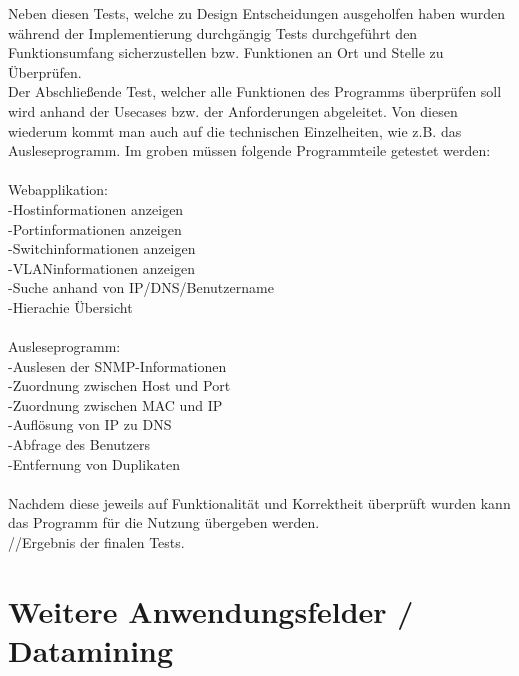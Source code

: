 Neben diesen Tests, welche zu Design Entscheidungen ausgeholfen haben wurden während der Implementierung durchgängig Tests durchgeführt den Funktionsumfang sicherzustellen bzw. Funktionen an Ort und Stelle zu Überprüfen.\\
Der Abschließende Test, welcher alle Funktionen des Programms überprüfen soll wird anhand der Usecases bzw. der Anforderungen abgeleitet. Von diesen wiederum kommt man auch auf die technischen Einzelheiten, wie z.B. das Ausleseprogramm.
Im groben müssen folgende Programmteile getestet werden:\\
\\
Webapplikation:\\
-Hostinformationen anzeigen\\
-Portinformationen anzeigen\\
-Switchinformationen anzeigen\\
-VLANinformationen anzeigen\\
-Suche anhand von IP/DNS/Benutzername\\
-Hierachie Übersicht\\
\\
Ausleseprogramm:\\
-Auslesen der SNMP-Informationen\\
-Zuordnung zwischen Host und Port \\
-Zuordnung zwischen MAC und IP\\
-Auflösung von IP zu DNS\\
-Abfrage des Benutzers\\
-Entfernung von Duplikaten\\
\\
Nachdem diese jeweils auf Funktionalität und Korrektheit überprüft wurden kann das Programm für die Nutzung übergeben werden.\\
//Ergebnis der finalen Tests.


\section{Weitere Anwendungsfelder / Datamining}
\label{sec:otherthoughts}


